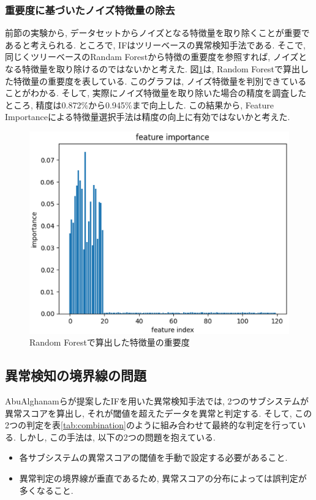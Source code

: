 \documentclass{css}
\begin{document}
\subsubsection{重要度に基づいたノイズ特徴量の除去}
前節の実験から, データセットからノイズとなる特徴量を取り除くことが重要であると考えられる. ところで, IFはツリーベースの異常検知手法である. そこで, 同じくツリーベースのRandam Forestから特徴の重要度を参照すれば, ノイズとなる特徴量を取り除けるのではないかと考えた. 図\ref{fig:select_noise}は, Random Forestで算出した特徴量の重要度を表している. このグラフは, ノイズ特徴量を判別できていることがわかる. そして, 実際にノイズ特徴量を取り除いた場合の精度を調査したところ, 精度は0.872\%から0.945\%まで向上した. この結果から, Feature Importanceによる特徴量選択手法は精度の向上に有効ではないかと考えた. 

\begin{figure}[ht]
    \centering
    \includegraphics[width=0.9\linewidth]{pictures/eps/select_noise.eps}
    \caption{Random Forestで算出した特徴量の重要度}
    \label{fig:select_noise}
\end{figure}

\subsection{異常検知の境界線の問題}
AbuAlghanamらが提案したIFを用いた異常検知手法\cite{AbuAlghanam2023-sx}では, 2つのサブシステムが異常スコアを算出し, それが閾値を超えたデータを異常と判定する. そして, この2つの判定を表\ref{tab:combination}のように組み合わせて最終的な判定を行っている. しかし, この手法は, 以下の2つの問題を抱えている. 

\begin{itemize}
    \item 各サブシステムの異常スコアの閾値を手動で設定する必要があること. 
    \item 異常判定の境界線が垂直であるため, 異常スコアの分布によっては誤判定が多くなること. 
\end{itemize}
\end{document}
